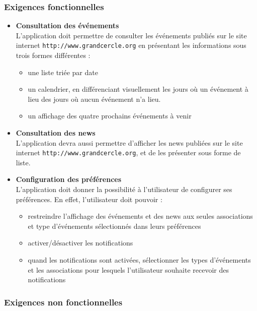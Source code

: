 \documentclass[a4paper, 11px]{article}
\begin{document}
\subsubsection{Exigences fonctionnelles}
\begin{itemize}
	\item[\textbullet] \textbf{Consultation des événements}\\
	L'application doit permettre de consulter les événements publiés sur le site internet \texttt{http://www.grandcercle.org} en présentant les informations sous trois formes différentes :
	\begin{itemize}
		\item une liste triée par date
		\item un calendrier, en différenciant visuellement les jours où un événement à lieu des jours où aucun événement n'a lieu.
		\item un affichage des quatre prochains événements à venir
	\\
	\end{itemize}

	\item[\textbullet] \textbf{Consultation des news}\\
	L'application devra aussi permettre d'afficher les news publiées sur le site internet \texttt{http://www.grandcercle.org}, et de les présenter sous forme de liste.\\
	\item[\textbullet] \textbf{Configuration des préférences}\\
	L'application doit donner la possibilité à l'utilisateur de configurer ses préférences. En effet, l'utilisateur doit pouvoir :
	\begin{itemize}
		\item restreindre l'affichage des événements et des news aux seules associations et type d'événements sélectionnés dans leurs préférences
		\item activer/désactiver les notifications
		\item quand les notifications sont activées, sélectionner les types d'événements et les associations pour lesquels l'utilisateur souhaite recevoir des notifications
	\end{itemize}
\end{itemize}

\subsubsection{Exigences non fonctionnelles}
\end{document}
